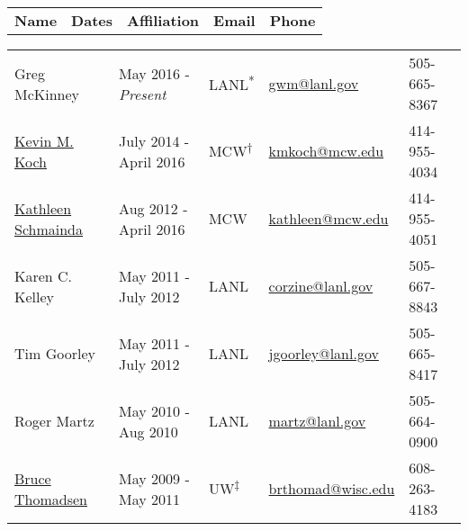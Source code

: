 


\begin{center}
\begin{minipage}{\textwidth}
\begin{tabular}{lllll}
\textbf{Name} & \textbf{Dates}  & \textbf{Affiliation} & \textbf{Email} & \textbf{Phone} \\
\end{tabular}
\end{minipage}
\end{center}


\begin{center}
\begin{minipage}{\textwidth}
\begin{tabular}{lllll}
Greg McKinney\label{greg_mckinney}& {May 2016 - \emph{Present}} & {LANL}\textsuperscript{*} &  \href{mailto:gwm@lanl.gov}{gwm@lanl.gov} & 505-665-8367 \\  %

{\href{http://www.mcw.edu/radiology/faculty/Kevin-Koch-PhD.htm}{Kevin M. Koch}}\label{kevin_koch}& {July 2014 - April 2016} & {MCW}\textsuperscript{$\dagger$} &  \href{mailto:kmkoch@mcw.edu}{kmkoch@mcw.edu} & 414-955-4034 \\  %

{\href{http://www.mcw.edu/radiology/faculty/Kathleen-Schmainda-PhD.htm}{Kathleen Schmainda}} \label{kathleen_schmainda}& {Aug 2012 - April 2016} & {MCW}  & \href{mailto:kathleen@mcw.edu}{kathleen@mcw.edu} &  414-955-4051 \\ %

{Karen C. Kelley} \label{karen_kelley} &   {May 2011 - July 2012} &{LANL} & \href{mailto:corzine@lanl.gov}{corzine@lanl.gov} & 505-667-8843\\ %

{Tim Goorley} \label{tim_goorley}& {May 2011 - July 2012} & {LANL} &\href{mailto:jgoorley@lanl.gov}{jgoorley@lanl.gov} & 505-665-8417\\ %

{Roger Martz}\label{roger_martz} & {May 2010 - Aug 2010} & {LANL}  & \href{mailto:martz@lanl.gov}{martz@lanl.gov} &  505-664-0900\\ %

{\href{https://www.medphysics.wisc.edu/directory/thomadsen.php}{Bruce Thomadsen}} \label{bruce_thomadsen}& {May 2009 - May 2011} & {UW}\textsuperscript{$\ddagger$} &  \href{mailto:brthomad@wisc.edu}{brthomad@wisc.edu} &  608-263-4183 \\ %

\end{tabular}
\end{minipage}
\end{center}

